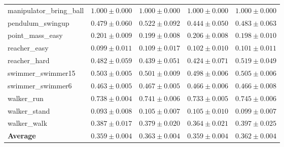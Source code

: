 \begin{tabular}{lrrrr}
  manipulator\_bring\_ball & $1.000\pm0.000$ & $1.000\pm0.000$ & $1.000\pm0.000$ & $1.000\pm0.000$ \\
  pendulum\_swingup & $0.479\pm0.060$ & $0.522\pm0.092$ & $0.444\pm0.050$ & $0.483\pm0.063$ \\
  point\_mass\_easy & $0.201\pm0.009$ & $0.199\pm0.008$ & $0.206\pm0.008$ & $0.198\pm0.010$ \\
  reacher\_easy & $0.099\pm0.011$ & $0.109\pm0.017$ & $0.102\pm0.010$ & $0.101\pm0.011$ \\
  reacher\_hard & $0.482\pm0.059$ & $\mathbf{0.439\pm0.051}$ & $0.424\pm0.071$ & $0.519\pm0.049$ \\
  swimmer\_swimmer15 & $0.503\pm0.005$ & $0.501\pm0.009$ & $0.498\pm0.006$ & $0.505\pm0.006$ \\
  swimmer\_swimmer6 & $0.463\pm0.005$ & $0.467\pm0.005$ & $0.466\pm0.006$ & $0.466\pm0.008$ \\
  walker\_run & $0.738\pm0.004$ & $0.741\pm0.006$ & $0.733\pm0.005$ & $0.745\pm0.006$ \\
  walker\_stand & $0.093\pm0.008$ & $0.105\pm0.007$ & $0.105\pm0.010$ & $0.099\pm0.007$ \\
  walker\_walk & $0.387\pm0.017$ & $0.379\pm0.020$ & $\mathbf{0.364\pm0.021}$ & $0.397\pm0.025$ \\
  \midrule
  \textbf{Average} & $0.359\pm0.004$ & $0.363\pm0.004$ & $0.359\pm0.004$ & $0.362\pm0.004$ \\
  \bottomrule
\end{tabular}
